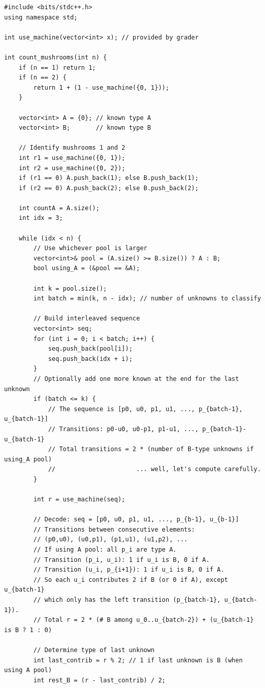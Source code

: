 \documentclass[11pt,a4paper]{article}
\begin{document}
\begin{lstlisting}
#include <bits/stdc++.h>
using namespace std;

int use_machine(vector<int> x); // provided by grader

int count_mushrooms(int n) {
    if (n == 1) return 1;
    if (n == 2) {
        return 1 + (1 - use_machine({0, 1}));
    }

    vector<int> A = {0}; // known type A
    vector<int> B;       // known type B

    // Identify mushrooms 1 and 2
    int r1 = use_machine({0, 1});
    int r2 = use_machine({0, 2});
    if (r1 == 0) A.push_back(1); else B.push_back(1);
    if (r2 == 0) A.push_back(2); else B.push_back(2);

    int countA = A.size();
    int idx = 3;

    while (idx < n) {
        // Use whichever pool is larger
        vector<int>& pool = (A.size() >= B.size()) ? A : B;
        bool using_A = (&pool == &A);

        int k = pool.size();
        int batch = min(k, n - idx); // number of unknowns to classify

        // Build interleaved sequence
        vector<int> seq;
        for (int i = 0; i < batch; i++) {
            seq.push_back(pool[i]);
            seq.push_back(idx + i);
        }
        // Optionally add one more known at the end for the last unknown
        if (batch <= k) {
            // The sequence is [p0, u0, p1, u1, ..., p_{batch-1}, u_{batch-1}]
            // Transitions: p0-u0, u0-p1, p1-u1, ..., p_{batch-1}-u_{batch-1}
            // Total transitions = 2 * (number of B-type unknowns if using_A pool)
            //                      ... well, let's compute carefully.
        }

        int r = use_machine(seq);

        // Decode: seq = [p0, u0, p1, u1, ..., p_{b-1}, u_{b-1}]
        // Transitions between consecutive elements:
        // (p0,u0), (u0,p1), (p1,u1), (u1,p2), ...
        // If using A pool: all p_i are type A.
        // Transition (p_i, u_i): 1 if u_i is B, 0 if A.
        // Transition (u_i, p_{i+1}): 1 if u_i is B, 0 if A.
        // So each u_i contributes 2 if B (or 0 if A), except u_{batch-1}
        // which only has the left transition (p_{batch-1}, u_{batch-1}).
        // Total r = 2 * (# B among u_0..u_{batch-2}) + (u_{batch-1} is B ? 1 : 0)

        // Determine type of last unknown
        int last_contrib = r % 2; // 1 if last unknown is B (when using A pool)
        int rest_B = (r - last_contrib) / 2;


\end{lstlisting}
\end{document}
